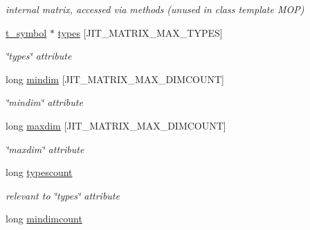 \begin{DoxyCompactItemize}
\begin{DoxyCompactList}\small\item\em internal matrix, accessed via methods (unused in class template MOP) \item\end{DoxyCompactList}\item 
\hypertarget{structt__jit__mop__io_a7dd176d160df0cd34c936f6016e6d463}{
\hyperlink{structt__symbol}{t\_\-symbol} $\ast$ \hyperlink{structt__jit__mop__io_a7dd176d160df0cd34c936f6016e6d463}{types} \mbox{[}JIT\_\-MATRIX\_\-MAX\_\-TYPES\mbox{]}}
\label{structt__jit__mop__io_a7dd176d160df0cd34c936f6016e6d463}

\begin{DoxyCompactList}\small\item\em \char`\"{}types\char`\"{} attribute \item\end{DoxyCompactList}\item 
\hypertarget{structt__jit__mop__io_aa3afc012bdfce53dcc204c9d86b53d60}{
long \hyperlink{structt__jit__mop__io_aa3afc012bdfce53dcc204c9d86b53d60}{mindim} \mbox{[}JIT\_\-MATRIX\_\-MAX\_\-DIMCOUNT\mbox{]}}
\label{structt__jit__mop__io_aa3afc012bdfce53dcc204c9d86b53d60}

\begin{DoxyCompactList}\small\item\em \char`\"{}mindim\char`\"{} attribute \item\end{DoxyCompactList}\item 
\hypertarget{structt__jit__mop__io_a53bb0bb7794a44a117de4ecbe0203278}{
long \hyperlink{structt__jit__mop__io_a53bb0bb7794a44a117de4ecbe0203278}{maxdim} \mbox{[}JIT\_\-MATRIX\_\-MAX\_\-DIMCOUNT\mbox{]}}
\label{structt__jit__mop__io_a53bb0bb7794a44a117de4ecbe0203278}

\begin{DoxyCompactList}\small\item\em \char`\"{}maxdim\char`\"{} attribute \item\end{DoxyCompactList}\item 
\hypertarget{structt__jit__mop__io_a09f66075fa0504f96835a4e17bdc40ae}{
long \hyperlink{structt__jit__mop__io_a09f66075fa0504f96835a4e17bdc40ae}{typescount}}
\label{structt__jit__mop__io_a09f66075fa0504f96835a4e17bdc40ae}

\begin{DoxyCompactList}\small\item\em relevant to \char`\"{}types\char`\"{} attribute \item\end{DoxyCompactList}\item 
\hypertarget{structt__jit__mop__io_a5d0e77f83daf0f10666bf411461eac3a}{
long \hyperlink{structt__jit__mop__io_a5d0e77f83daf0f10666bf411461eac3a}{mindimcount}}
\label{structt__jit__mop__io_a5d0e77f83daf0f10666bf411461eac3a}


\end{DoxyCompactItemize}

